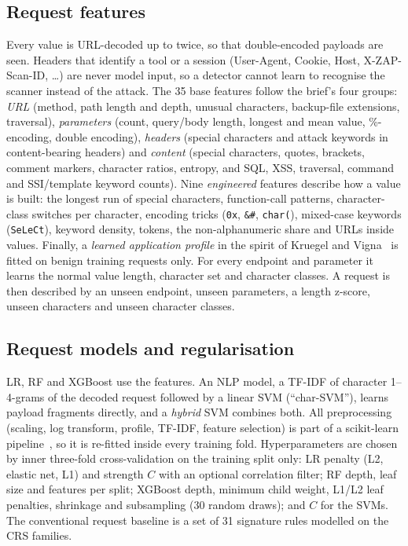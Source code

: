 \documentclass[conference]{IEEEtran}
\begin{document}
\subsection{Request features}
Every value is URL-decoded up to twice, so that double-encoded payloads are seen. Headers that identify
a tool or a session (User-Agent, Cookie, Host, X-ZAP-Scan-ID, \dots) are never model input, so a
detector cannot learn to recognise the scanner instead of the attack. The 35 base features
follow the brief's four groups:
\emph{URL} (method, path length and depth, unusual characters, backup-file extensions, traversal),
\emph{parameters} (count, query/body length, longest and mean value, \%-encoding, double encoding),
\emph{headers} (special characters and attack keywords in content-bearing headers) and
\emph{content} (special characters, quotes, brackets, comment markers, character ratios, entropy, and
SQL, XSS, traversal, command and SSI/template keyword counts).
Nine \emph{engineered} features describe how a value is built: the longest run of special characters,
function-call patterns, character-class switches per character, encoding tricks (\texttt{0x}, \texttt{\&\#},
\texttt{char(}), mixed-case keywords (\texttt{SeLeCt}), keyword density, tokens, the non-alphanumeric
share and URLs inside values.
Finally, a \emph{learned application profile} in the spirit of Kruegel and Vigna~\cite{kruegel2003}
is fitted on benign training requests only. For every endpoint and parameter it learns the normal
value length, character set and character classes. A request is then described by an unseen
endpoint, unseen parameters, a length z-score, unseen characters and unseen character classes.

\subsection{Request models and regularisation}
LR, RF and XGBoost use the features. An NLP model, a TF-IDF of character 1--4-grams of the decoded request
followed by a linear SVM (``char-SVM''), learns payload fragments directly, and a \emph{hybrid} SVM combines
both. All preprocessing (scaling, log transform, profile, TF-IDF, feature selection) is part of a
scikit-learn pipeline~\cite{sklearn}, so it is re-fitted inside every training fold.
Hyperparameters are chosen by inner three-fold cross-validation on the training split only:
LR penalty (L2, elastic net, L1) and strength $C$ with an optional correlation filter;
RF depth, leaf size and features per split; XGBoost depth, minimum child weight, L1/L2 leaf
penalties, shrinkage and subsampling (30 random draws); and $C$ for the SVMs.
The conventional request baseline is a set of 31 signature rules modelled on the CRS families.
\end{document}
